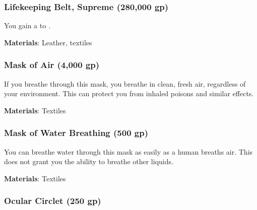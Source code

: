 \lowercase{\hypertarget{item:Lifekeeping Belt, Supreme}{}}\label{item:Lifekeeping Belt, Supreme}
\hypertarget{item:Lifekeeping Belt, Supreme}{\subsubsection{Lifekeeping Belt, Supreme\hfill{} (280,000 gp)}}

You gain a   to .



\vspace{0.25em}
\textbf{Materials}: Leather, textiles


\lowercase{\hypertarget{item:Mask of Air}{}}\label{item:Mask of Air}
\hypertarget{item:Mask of Air}{\subsubsection{Mask of Air\hfill{} (4,000 gp)}}

If you breathe through this mask, you breathe in clean, fresh air, regardless of your environment.
This can protect you from inhaled poisons and similar effects.



\vspace{0.25em}
\textbf{Materials}: Textiles


\lowercase{\hypertarget{item:Mask of Water Breathing}{}}\label{item:Mask of Water Breathing}
\hypertarget{item:Mask of Water Breathing}{\subsubsection{Mask of Water Breathing\hfill{} (500 gp)}}

You can breathe water through this mask as easily as a human breaths air.
This does not grant you the ability to breathe other liquids.



\vspace{0.25em}
\textbf{Materials}: Textiles


\lowercase{\hypertarget{item:Ocular Circlet}{}}\label{item:Ocular Circlet}
\hypertarget{item:Ocular Circlet}{\subsubsection{Ocular Circlet\hfill{} (250 gp)}}

